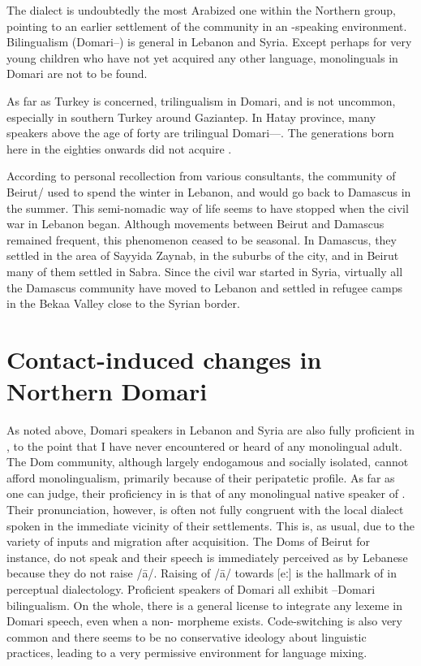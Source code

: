 \documentclass[output=paper]{langsci/langscibook}
\begin{document}
The  dialect is undoubtedly the most Arabized one within the Northern group, pointing to an earlier settlement of the community in an -speaking environment. Bilingualism (Domari--) is general in Lebanon and Syria. Except perhaps for very young children who have not yet acquired any other language, monolinguals in Domari are not to be found.

As far as Turkey is concerned, trilingualism in Domari,  and  is not uncommon, especially in southern Turkey around Gaziantep. In Hatay province, many speakers above the age of forty are trilingual Domari----. The generations born here in the eighties onwards did not acquire . 

According to personal recollection from various consultants, the community of Beirut/ used to spend the winter in Lebanon, and would go back to Damascus in the summer. This semi-nomadic way of life seems to have stopped when the civil war in Lebanon began. Although movements between Beirut and Damascus remained frequent, this phenomenon ceased to be seasonal. In Damascus, they settled in the area of Sayyida Zaynab, in the suburbs of the city, and in Beirut many of them settled in Sabra. Since the civil war started in Syria, virtually all the Damascus community have moved to Lebanon and settled in refugee camps in the Bekaa Valley close to the Syrian border.\pagebreak

\section{Contact-induced changes in Northern Domari}

As noted above, Domari speakers in Lebanon and Syria are also fully proficient in , to the point that I have never encountered or heard of any {monolingual} adult. The Dom community, although largely endogamous and socially isolated, cannot afford monolingualism, primarily because of their peripatetic profile. As far as one can judge, their proficiency in  is that of any {monolingual} native speaker of . Their pronunciation, however, is often not fully congruent with the local dialect spoken in the immediate vicinity of their settlements. This is, as usual, due to the variety of inputs and migration after acquisition. The Doms of Beirut for instance, do not speak   and their speech is immediately perceived as  by {Lebanese} because they do not raise /ā/. Raising of /ā/ towards [eː] is the hallmark of   in perceptual dialectology. Proficient speakers of Domari all exhibit --Domari {bilingualism}. On the whole, there is a general license to integrate any  lexeme in Domari speech, even when a non- morpheme exists. Code-switching is also very common and there seems to be no conservative ideology about linguistic practices, leading to a very permissive environment for language mixing.
\end{document}
